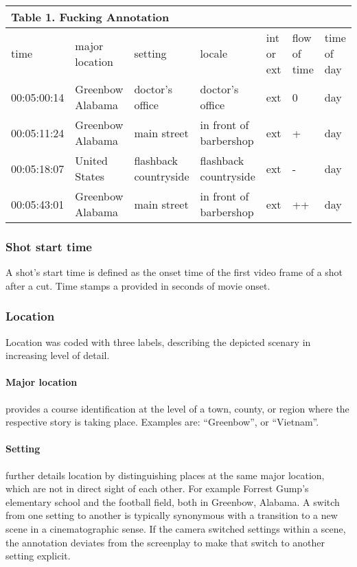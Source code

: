 \documentclass[10pt,a4paper,twocolumn]{article}
\begin{document}
\begin{table}[h]
\begin{tabular}{lllllll}
\multicolumn{7}{l}{Table 1. Fucking Annotation}\tabularnewline
\hline 
time & major location & setting & locale & int or ext & flow of time & time of day\tabularnewline
00:05:00:14  & Greenbow Alabama  & doctor's office  & doctor's office  & ext  & 0 & day\tabularnewline
00:05:11:24  & Greenbow Alabama  & main street  & in front of barbershop  & ext  & + & day\tabularnewline
00:05:18:07  & United States  & flashback countryside  & flashback countryside  & ext  & - & day\tabularnewline
00:05:43:01 & Greenbow Alabama  & main street  & in front of barbershop  & ext  & ++ & day\tabularnewline
\hline 
\end{tabular}
\end{table}



\subsubsection*{Shot start time}

A shot's start time is defined as the onset time of the first video frame of a
shot after a cut. Time stamps a provided in seconds of movie onset. 

\subsubsection*{Location}

Location was coded with three labels, describing the depicted scenary
in increasing level of detail.

\paragraph{Major location} provides a course identification at the level of a
town, county, or region where the respective story is taking place. Examples are:
``Greenbow'', or ``Vietnam''.

\paragraph{Setting} further details location by distinguishing places at the same
major location, which are not in direct sight of each other. For example
Forrest Gump's elementary school and the football field, both in Greenbow,
Alabama. A switch from one setting to another is typically synonymous with a
transition to a new scene in a cinematographic sense. If the camera switched 
settings within a scene, the annotation deviates from the screenplay to make that
switch to another setting explicit.
\end{document}
